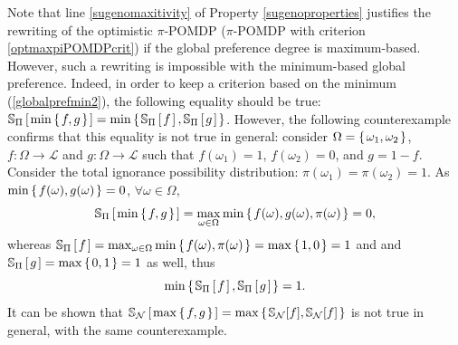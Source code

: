 Note that line \ref{sugenomaxitivity} of Property \ref{sugenoproperties} 
justifies the rewriting of the optimistic $\pi$-POMDP 
($\pi$-POMDP with criterion \ref{optmaxpiPOMDPcrit})
if the global preference degree is maximum-based.
However, such a rewriting is impossible with the minimum-based global preference.
Indeed, in order to keep a criterion based on the minimum (\ref{globalprefmin2}), 
the following equality should be true: $ \mathbb{S}_{\Pi} \left[ \left.  \min \left\{ \left.  f, g \right. \right\}  \right. \right] = \min \left\{ \left.  \mathbb{S}_{\Pi} \left[ \left. f \right. \right], \mathbb{S}_{\Pi} \left[ \left. g \right. \right]  \right. \right\} $.
However, the following counterexample confirms that this equality is not true in general:
consider $\Omega = \left\{ \left.  \omega_1, \omega_2  \right. \right\}$, $f:\Omega \rightarrow \mathcal{L}$ and $g:\Omega \rightarrow \mathcal{L}$ such that $f(\omega_1) = 1$, $f(\omega_2) = 0$,
and $g = 1 - f$. Consider the total ignorance possibility distribution: $\pi(\omega_1) = \pi(\omega_2) = 1$. As $\min \left\{ \left.  f(\omega), g(\omega)  \right. \right\} = 0$, $\forall \omega \in \Omega$,
\[ \mathbb{S}_{\Pi} \left[ \left.  \min\left\{ \left.  f,g  \right. \right\}  \right. \right] = \max_{\omega \in \Omega} \min \left\{ \left.  f(\omega), g(\omega), \pi(\omega)  \right. \right\} = 0, \] 
whereas $\mathbb{S}_{\Pi} \left[ \left.  f  \right. \right] = \max_{\omega \in \Omega} \min \left\{ \left.  f(\omega), \pi(\omega)  \right. \right\} = \max \left\{ \left.  1,0  \right. \right\} = 1$ and
and $\mathbb{S}_{\Pi} \left[ \left.  g  \right. \right] = \max \left\{ \left.  0,1  \right. \right\} = 1$ as well, thus 
\[\min \left\{ \left. \mathbb{S}_{\Pi} \left[ \left.  f  \right. \right], \mathbb{S}_{\Pi} \left[ \left.  g  \right. \right]  \right. \right\} = 1. \] 
It can be shown that $\mathbb{S}_{\mathcal{N}} \left[ \left.  \max \left\{ \left. f,g \right. \right\}  \right. \right] = \max \left\{ \left.  \mathbb{S}_{\mathcal{N}}[f], \mathbb{S}_{\mathcal{N}}[f] \right. \right\}$
is not true in general, with the same counterexample.


